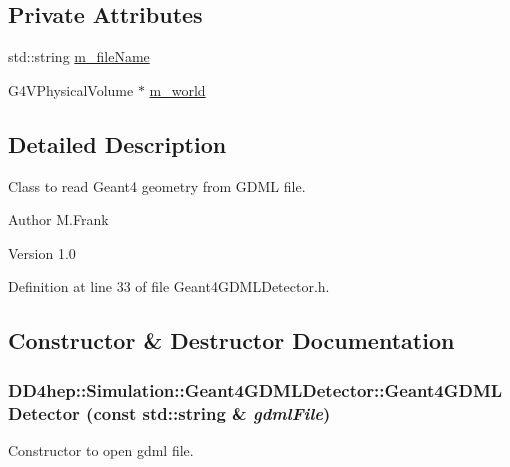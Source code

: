 \subsection*{Private Attributes}
\begin{DoxyCompactItemize}
\item 
std::string \hyperlink{class_d_d4hep_1_1_simulation_1_1_geant4_g_d_m_l_detector_a48ddc632f08c696ac90deb8c27eaf43a}{m\_\-fileName}
\item 
G4VPhysicalVolume $\ast$ \hyperlink{class_d_d4hep_1_1_simulation_1_1_geant4_g_d_m_l_detector_a26c0472c7321ec265414a1329ba5fdf3}{m\_\-world}
\end{DoxyCompactItemize}


\subsection{Detailed Description}
Class to read Geant4 geometry from GDML file. \begin{DoxyAuthor}{Author}
M.Frank 
\end{DoxyAuthor}
\begin{DoxyVersion}{Version}
1.0 
\end{DoxyVersion}


Definition at line 33 of file Geant4GDMLDetector.h.

\subsection{Constructor \& Destructor Documentation}
\hypertarget{class_d_d4hep_1_1_simulation_1_1_geant4_g_d_m_l_detector_a4bdf71880b0a663f8e2954eed4fc891d}{
\subsubsection[{Geant4GDMLDetector}]{\setlength{\rightskip}{0pt plus 5cm}DD4hep::Simulation::Geant4GDMLDetector::Geant4GDMLDetector (const std::string \& {\em gdmlFile})}}
\label{class_d_d4hep_1_1_simulation_1_1_geant4_g_d_m_l_detector_a4bdf71880b0a663f8e2954eed4fc891d}


Constructor to open gdml file. 

